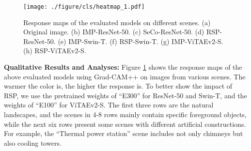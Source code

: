 \documentclass[10pt, journal,twoside]{IEEEtran}
\begin{document}
\begin{figure}[t]
  \centering
  \texttt{[image: ./figure/cls/heatmap\_1.pdf]}\\
  \caption{Response maps of the evaluated models on different scenes. (a) Original image. (b) IMP-ResNet-50. (c) SeCo-ResNet-50. (d) RSP-ResNet-50. (e) IMP-Swin-T. (f) RSP-Swin-T. (g) IMP-ViTAEv2-S. (h) RSP-ViTAEv2-S.}
  \label{heatmap}
\end{figure}

\textbf{Qualitative Results and Analyses:} Figure \ref{heatmap} shows the response maps of the above evaluated models using Grad-CAM++ \cite{grad_cam_pp} on images from various scenes. The warmer the color is, the higher the response is. To better show the impact of RSP, we use the pretrained weights of ``E300'' for ResNet-50 and Swin-T, and the weights of ``E100'' for ViTAEv2-S. The first three rows are the natural landscapes, and the scenes in 4-8 rows mainly contain specific foreground objects, while the next six rows present some scenes with different artificial constructions. For example, the ``Thermal power station'' scene includes not only chimneys but also cooling towers.
\end{document}
